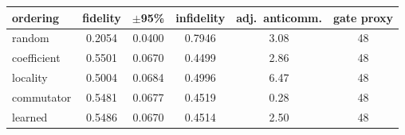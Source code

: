 \begin{tabular}{lccccc}
\toprule
ordering & fidelity & $\pm$95\% & infidelity & adj.\ anticomm. & gate proxy \\
\midrule
random & 0.2054 & 0.0400 & 0.7946 & 3.08 & 48 \\
coefficient & 0.5501 & 0.0670 & 0.4499 & 2.86 & 48 \\
locality & 0.5004 & 0.0684 & 0.4996 & 6.47 & 48 \\
commutator & 0.5481 & 0.0677 & 0.4519 & 0.28 & 48 \\
learned & 0.5486 & 0.0670 & 0.4514 & 2.50 & 48 \\
\bottomrule
\end{tabular}
